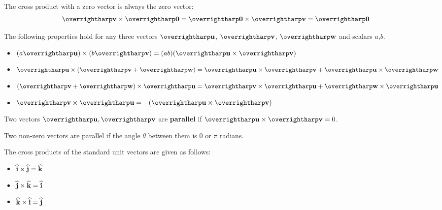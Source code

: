 \documentclass[letterpaper, twoside, 12pt]{book}
\begin{document}
\begin{definition}
  The cross product with a zero vector is always the zero vector:
  \[\harpvec{v}\times\harpvec{0}=\harpvec{0}\times\harpvec{v}=\harpvec{0}\]
\end{definition}

\begin{theorem}
  The following properties hold for any three vectors $\harpvec{u}$, $\harpvec{v}$,
  $\harpvec{w}$ and scalars $a$,$b$.
  \begin{itemize}
  \item $(a\harpvec{u}) \times (b\harpvec{v}) = (ab)(\harpvec{u} \times \harpvec{v})$
  \item
    $\harpvec{u} \times (\harpvec{v} + \harpvec{w}) =
    \harpvec{u} \times \harpvec{v} + \harpvec{u} \times \harpvec{w}$
  \item
    $(\harpvec{v} + \harpvec{w}) \times \harpvec{u} =
    \harpvec{v} \times \harpvec{u} + \harpvec{w} \times \harpvec{u}$
  \item $\harpvec{v} \times \harpvec{u} = -(\harpvec{u} \times \harpvec{v})$
  \end{itemize}
\end{theorem}

\begin{definition}
  Two vectors $\harpvec{u},\harpvec{v}$ are \textbf{parallel} if
  $\harpvec{u} \times \harpvec{v} = 0$.
\end{definition}

\begin{theorem}
  Two non-zero vectors are parallel if the angle $\theta$ between them
  is $0$ or $\pi$ radians.
\end{theorem}

\begin{definition}
  The cross products of the standard unit vectors are given as follows:
  \begin{itemize}
    \item $\mathbf{\widehat{i}} \times \mathbf{\widehat{j}} = \mathbf{\widehat{k}}$
    \item $\mathbf{\widehat{j}} \times \mathbf{\widehat{k}} = \mathbf{\widehat{i}}$
    \item $\mathbf{\widehat{k}} \times \mathbf{\widehat{i}} = \mathbf{\widehat{j}}$
  \end{itemize}
\end{definition}
\end{document}
